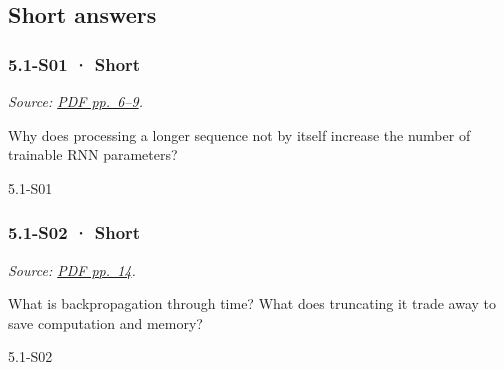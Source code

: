 \subsection{Short answers}\label{short-answers-12}

\noindent\begin{minipage}{\linewidth}

\subsubsection{5.1-S01 · Short}\label{s01-short-12}

\emph{Source:
\href{../Lecture\%20Slides/5.1.\%20Sequence\%20Models.pdf\#page=6}{PDF
pp.~6--9}.}

Why does processing a longer sequence not by itself increase the number
of trainable RNN parameters?

\begin{solution}[20mm]{5.1-S01}

\end{solution}
\end{minipage}\par\medskip

\noindent\begin{minipage}{\linewidth}

\subsubsection{5.1-S02 · Short}\label{s02-short-12}

\emph{Source:
\href{../Lecture\%20Slides/5.1.\%20Sequence\%20Models.pdf\#page=14}{PDF
pp.~14}.}

What is backpropagation through time? What does truncating it trade away
to save computation and memory?

\begin{solution}[20mm]{5.1-S02}

\end{solution}
\end{minipage}\par\medskip

